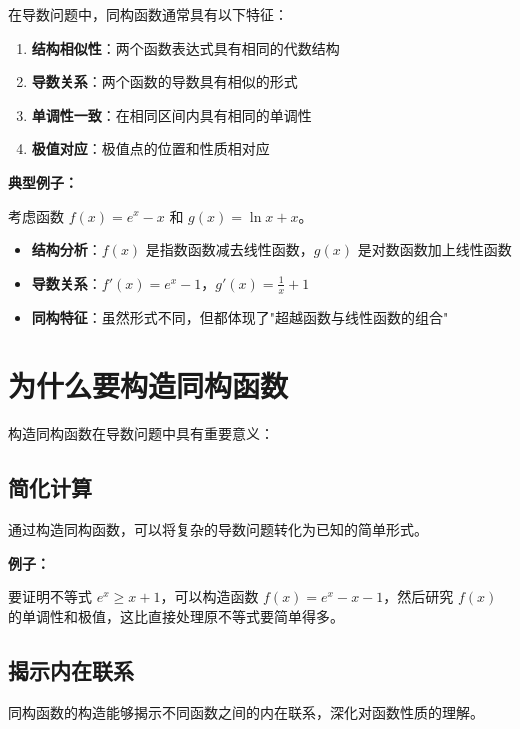 \documentclass[a4paper,11pt]{ctexrep}
\newcommand{\exampleicon}{\ModeBadge[highlight]{例题}}
\theoremstyle{definition}
\begin{document}
在导数问题中，同构函数通常具有以下特征：

\begin{methodbox}[同构函数的识别特征]
\begin{enumerate}
    \item \textbf{结构相似性}：两个函数表达式具有相同的代数结构
    \item \textbf{导数关系}：两个函数的导数具有相似的形式
    \item \textbf{单调性一致}：在相同区间内具有相同的单调性
    \item \textbf{极值对应}：极值点的位置和性质相对应
\end{enumerate}
\end{methodbox}

\exampleicon \textbf{典型例子：}

考虑函数 $f(x) = e^x - x$ 和 $g(x) = \ln x + x$。

\begin{itemize}
    \item \textbf{结构分析}：$f(x)$ 是指数函数减去线性函数，$g(x)$ 是对数函数加上线性函数
    \item \textbf{导数关系}：$f'(x) = e^x - 1$，$g'(x) = \frac{1}{x} + 1$
    \item \textbf{同构特征}：虽然形式不同，但都体现了"超越函数与线性函数的组合"
\end{itemize}

\section{为什么要构造同构函数}

构造同构函数在导数问题中具有重要意义：

\subsection{简化计算}

通过构造同构函数，可以将复杂的导数问题转化为已知的简单形式。

\exampleicon \textbf{例子：}

要证明不等式 $e^x \geq x + 1$，可以构造函数 $f(x) = e^x - x - 1$，然后研究 $f(x)$ 的单调性和极值，这比直接处理原不等式要简单得多。

\subsection{揭示内在联系}

同构函数的构造能够揭示不同函数之间的内在联系，深化对函数性质的理解。
\end{document}
